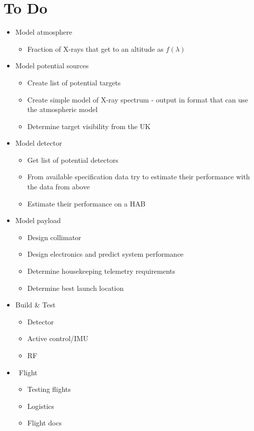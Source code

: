 \documentclass[10pt,a4paper]{article}
\begin{document}
\section*{To Do}

\begin{itemize}

\item Model atmosphere
\begin{itemize}
\item Fraction of X-rays that get to an altitude as $f\left( \lambda \right)$
\end{itemize}

\item Model potential sources
\begin{itemize}
\item Create list of potential targets
\item Create simple model of X-ray spectrum - output in format that can use the atmospheric model
\item Determine target visibility from the UK
\end{itemize}

\item Model detector
\begin{itemize}
\item Get list of potential detectors
\item From available specification data try to estimate their performance with the data from above
\item Estimate their performance on a HAB
\end{itemize}

\item Model payload
\begin{itemize}
\item Design collimator
\item Design electronics and predict system performance 
\item Determine housekeeping telemetry requirements
\item Determine best launch location
\end{itemize}

\item Build \& Test
\begin{itemize}
\item Detector
\item Active control/IMU
\item RF
\end{itemize}


\item \ Flight
\begin{itemize}
\item Testing flights
\item Logistics
\item Flight docs
\end{itemize}


\end{itemize}
\end{document}
